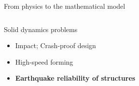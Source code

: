\begin{frame}{From physics to the mathematical model}
\begin{overprint}
    \begin{columns}
      \begin{column}{0.45\textwidth}
        \begin{block}{Solid dynamics problems}
          \begin{itemize}
          \item[] Impact; Crash-proof design
          \item[] High-speed forming
          \item[] \textbf{Earthquake reliability of structures}
          \end{itemize}
        \end{block}
      \end{column}
      
      \begin{column}{0.55\textwidth}
      \end{column}
    \end{columns}


\end{overprint}
\end{frame}
